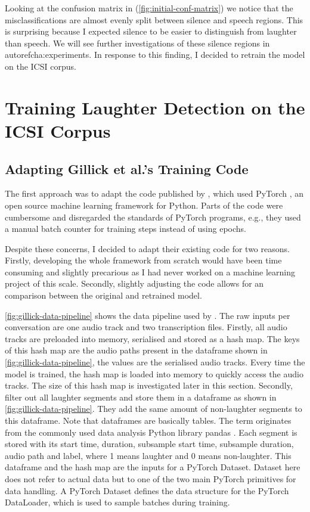 \documentclass[bsc,frontabs,parskip,deptreport]{infthesis}
\begin{document}
Looking at the confusion matrix in (\autoref{fig:initial-conf-matrix}) we notice that the misclassifications are almost evenly split between silence and speech regions. This is surprising because I expected silence to be easier to distinguish from laughter than speech.
We will see further investigations of these silence regions in autoref{cha:experiments}.
In response to this finding, I decided to retrain the model on the ICSI corpus. 


\chapter{Training Laughter Detection on the ICSI Corpus} \label{cha:retraining}
\section{Adapting Gillick et al.'s Training Code} \label{sec:adapting-gillick-training}
The first approach was to adapt the code published by \citet{gillick-codebase}, which used PyTorch \citep{pytorch2017automatic}, an open source machine learning framework for Python.
Parts of the code were cumbersome and disregarded the standards of PyTorch programs, e.g., they used a manual batch counter for training steps instead of using epochs.  

Despite these concerns, I decided to adapt their existing code for two reasons.
Firstly, developing the whole framework from scratch would have been time consuming and slightly precarious as I had never worked on a machine learning project of this scale.
Secondly, slightly adjusting the code allows for an comparison between the original and retrained model. 

\autoref{fig:gillick-data-pipeline} shows the data pipeline used by \citet{gillick2021robust}. The raw inputs per conversation are one audio track and two transcription files. 
Firstly, all audio tracks are preloaded into memory, serialised and stored as a hash map. The keys of this hash map are the audio paths present in the dataframe shown in \autoref{fig:gillick-data-pipeline}, the values are the serialised audio tracks. Every time the model is trained, the hash map is loaded into memory to quickly access the audio tracks. The size of this hash map is investigated later in this section.
Secondly, \citet{gillick2021robust} filter out all laughter segments and store them in a dataframe as shown in \autoref{fig:gillick-data-pipeline}.
They add the same amount of non-laughter segments to this dataframe. 
Note that dataframes are basically tables. The term originates from the commonly used data analysis Python library pandas \citep{jeff_reback_2021_5574486}.
Each segment is stored with its start time, duration, subsample start time, subsample duration, audio path and label, where 1 means laughter and 0 means non-laughter. 
This dataframe and the hash map are the inputs for a PyTorch Dataset. Dataset here does not refer to actual data but to one of the two main PyTorch primitives for data handling. A PyTorch Dataset defines the data structure for the PyTorch DataLoader, which is used to sample batches during training.
\end{document}
